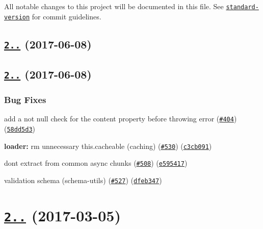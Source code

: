 All notable changes to this project will be documented in this file. See \href{https://github.com/conventional-changelog/standard-version}{\tt standard-\/version} for commit guidelines.

\label{_2.1.2}%
 \subsection*{\href{https://github.com/webpack-contrib/extract-text-webpack-plugin/compare/v2.1.1...v2.1.2}{\tt 2..} (2017-\/06-\/08)}

\label{_2.1.1}%
 \subsection*{\href{https://github.com/webpack-contrib/extract-text-webpack-plugin/compare/v2.1.0...v2.1.1}{\tt 2..} (2017-\/06-\/08)}

\subsubsection*{Bug Fixes}


\begin{DoxyItemize}
\item add a not null check for the content property before throwing error (\href{https://github.com/webpack-contrib/extract-text-webpack-plugin/issues/404}{\tt \#404}) (\href{https://github.com/webpack-contrib/extract-text-webpack-plugin/commit/58dd5d3}{\tt 58dd5d3})
\item {\bfseries loader\+:} rm unnecessary {\ttfamily this.\+cacheable} (caching) (\href{https://github.com/webpack-contrib/extract-text-webpack-plugin/issues/530}{\tt \#530}) (\href{https://github.com/webpack-contrib/extract-text-webpack-plugin/commit/c3cb091}{\tt c3cb091})
\item don\textquotesingle{}t extract from common async chunks (\href{https://github.com/webpack-contrib/extract-text-webpack-plugin/issues/508}{\tt \#508}) (\href{https://github.com/webpack-contrib/extract-text-webpack-plugin/commit/e595417}{\tt e595417})
\item validation schema ({\ttfamily schema-\/utils}) (\href{https://github.com/webpack-contrib/extract-text-webpack-plugin/issues/527}{\tt \#527}) (\href{https://github.com/webpack-contrib/extract-text-webpack-plugin/commit/dfeb347}{\tt dfeb347})
\end{DoxyItemize}

\label{_2.1.0}%
 \section*{\href{https://github.com/webpack/extract-text-webpack-plugin/compare/v2.0.0...v2.1.0}{\tt 2..} (2017-\/03-\/05)}

